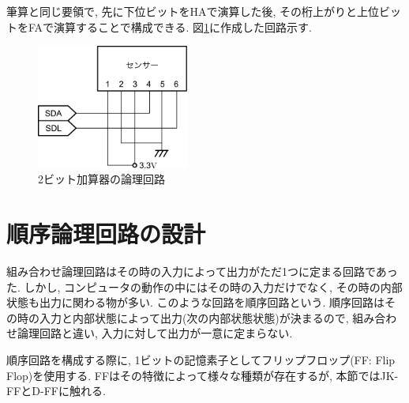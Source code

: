 \documentclass[titlepage]{jsarticle}
\begin{document}
    筆算と同じ要領で, 先に下位ビットをHAで演算した後, その桁上がりと上位ビットをFAで演算することで構成できる.
    図\ref{fig:2bit_adder}に作成した回路示す.
    \begin{figure}[h]
      \centering
      \includegraphics[width=5cm]{images/haisen.pdf}
      \caption{2ビット加算器の論理回路}
      \label{fig:2bit_adder}
    \end{figure}
\section{順序論理回路の設計}
  組み合わせ論理回路はその時の入力によって出力がただ1つに定まる回路であった.
  しかし, コンピュータの動作の中にはその時の入力だけでなく, その時の内部状態も出力に関わる物が多い.
  このような回路を順序回路という.
  順序回路はその時の入力と内部状態によって出力(次の内部状態状態)が決まるので,
  組み合わせ論理回路と違い, 入力に対して出力が一意に定まらない.

  順序回路を構成する際に, 1ビットの記憶素子としてフリップフロップ(FF: Flip Flop)を使用する.
  FFはその特徴によって様々な種類が存在するが, 本節ではJK-FFとD-FFに触れる.
\end{document}
